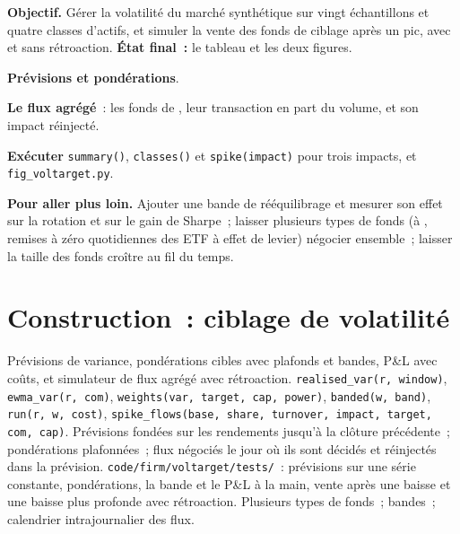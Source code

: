 \begin{tutorial}
\textbf{Objectif.} Gérer la volatilité du marché synthétique sur vingt échantillons et quatre classes d'actifs, et simuler la vente des fonds de ciblage après un
pic, avec et sans rétroaction. \textbf{État final~:} le tableau et les deux figures.
\begin{tutsteps}
\item \textbf{Prévisions et pondérations}.
\label{lst:s1:volatility-targeting-and-risk-managed-portfolios:weights}
\item \textbf{Le flux agrégé}~: les fonds de , leur transaction en part du volume, et son impact réinjecté.
\label{lst:s1:volatility-targeting-and-risk-managed-portfolios:flow}
\item \textbf{Exécuter} \texttt{summary()}, \texttt{classes()} et \texttt{spike(impact)} pour trois impacts, et \texttt{fig\_voltarget.py}.
\end{tutsteps}
\textbf{Pour aller plus loin.} Ajouter une bande de rééquilibrage et mesurer son effet sur la rotation et sur le gain de Sharpe~; laisser plusieurs types de fonds (à ,
remises à zéro quotidiennes des ETF à effet de levier) négocier ensemble~; laisser la taille des fonds croître au fil du temps.
\end{tutorial}

\section{Construction~: ciblage de volatilité}\label{bld:s1:volatility-targeting-and-risk-managed-portfolios:voltarget}

\begin{build}
 Prévisions de variance, pondérations cibles avec plafonds et bandes, P\&L avec coûts, et simulateur de flux agrégé avec rétroaction.
 \texttt{realised\_var(r, window)}, \texttt{ewma\_var(r, com)}, \texttt{weights(var, target, cap, power)}, \texttt{banded(w, band)},
\texttt{run(r, w, cost)}, \texttt{spike\_flows(base, share, turnover, impact, target, com, cap)}.
 Prévisions fondées sur les rendements jusqu'à la clôture précédente~; pondérations plafonnées~; flux négociés le jour où ils sont décidés et réinjectés dans la prévision.
 \texttt{code/firm/voltarget/tests/}~: prévisions sur une série constante, pondérations, la bande et le P\&L à la main, vente après une baisse
et une baisse plus profonde avec rétroaction.
 Plusieurs types de fonds~; bandes~; calendrier intrajournalier des flux.
\end{build}


